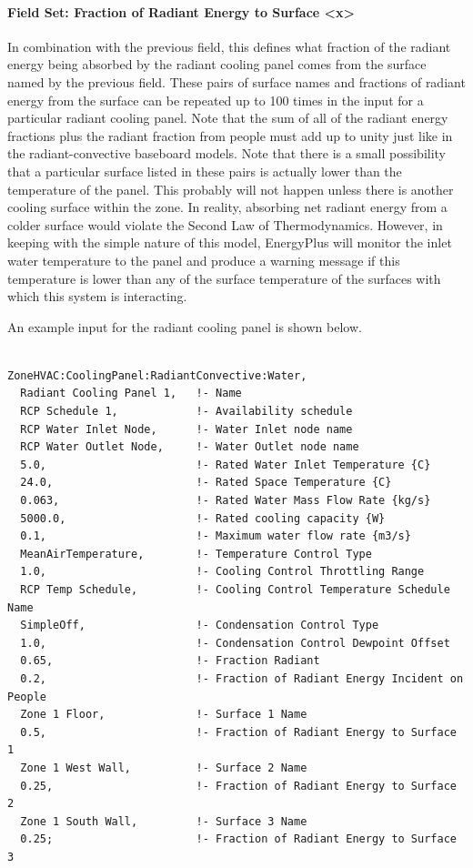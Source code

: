 \paragraph{Field Set: Fraction of Radiant Energy to Surface \textless{}x\textgreater{}}\label{field-set-fraction-of-radiant-energy-to-surface-x-1}

In combination with the previous field, this defines what fraction of the radiant energy being absorbed by the radiant cooling panel comes from the surface named by the previous field.  These pairs of surface names and fractions of radiant energy from the surface can be repeated up to 100 times in the input for a particular radiant cooling panel.  Note that the sum of all of the radiant energy fractions plus the radiant fraction from people must add up to unity just like in the radiant-convective baseboard models.  Note that there is a small possibility that a particular surface listed in these pairs is actually lower than the temperature of the panel.  This probably will not happen unless there is another cooling surface within the zone.  In reality, absorbing net radiant energy from a colder surface would violate the Second Law of Thermodynamics.  However, in keeping with the simple nature of this model, EnergyPlus will monitor the inlet water temperature to the panel and produce a warning message if this temperature is lower than any of the surface temperature of the surfaces with which this system is interacting.

An example input for the radiant cooling panel is shown below.

\begin{lstlisting}

ZoneHVAC:CoolingPanel:RadiantConvective:Water,
  Radiant Cooling Panel 1,   !- Name
  RCP Schedule 1,            !- Availability schedule
  RCP Water Inlet Node,      !- Water Inlet node name
  RCP Water Outlet Node,     !- Water Outlet node name
  5.0,                       !- Rated Water Inlet Temperature {C}
  24.0,                      !- Rated Space Temperature {C}
  0.063,                     !- Rated Water Mass Flow Rate {kg/s}
  5000.0,                    !- Rated cooling capacity {W}
  0.1,                       !- Maximum water flow rate {m3/s}
  MeanAirTemperature,        !- Temperature Control Type
  1.0,                       !- Cooling Control Throttling Range
  RCP Temp Schedule,         !- Cooling Control Temperature Schedule Name
  SimpleOff,                 !- Condensation Control Type
  1.0,                       !- Condensation Control Dewpoint Offset
  0.65,                      !- Fraction Radiant
  0.2,                       !- Fraction of Radiant Energy Incident on People
  Zone 1 Floor,              !- Surface 1 Name
  0.5,                       !- Fraction of Radiant Energy to Surface 1
  Zone 1 West Wall,          !- Surface 2 Name
  0.25,                      !- Fraction of Radiant Energy to Surface 2
  Zone 1 South Wall,         !- Surface 3 Name
  0.25;                      !- Fraction of Radiant Energy to Surface 3
\end{lstlisting}

